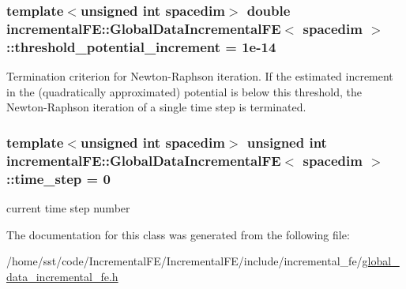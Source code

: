 \subsubsection[{\texorpdfstring{threshold\+\_\+potential\+\_\+increment}{threshold_potential_increment}}]{\setlength{\rightskip}{0pt plus 5cm}template$<$unsigned int spacedim$>$ double {\bf incremental\+F\+E\+::\+Global\+Data\+Incremental\+FE}$<$ spacedim $>$\+::threshold\+\_\+potential\+\_\+increment = 1e-\/14\hspace{0.3cm}{\ttfamily [private]}}\hypertarget{classincremental_f_e_1_1_global_data_incremental_f_e_a2f7adb8b4f7f8875715e1dbd0edd9ac8}{}\label{classincremental_f_e_1_1_global_data_incremental_f_e_a2f7adb8b4f7f8875715e1dbd0edd9ac8}
Termination criterion for Newton-\/\+Raphson iteration. If the estimated increment in the (quadratically approximated) potential is below this threshold, the Newton-\/\+Raphson iteration of a single time step is terminated. 
\subsubsection[{\texorpdfstring{time\+\_\+step}{time_step}}]{\setlength{\rightskip}{0pt plus 5cm}template$<$unsigned int spacedim$>$ unsigned int {\bf incremental\+F\+E\+::\+Global\+Data\+Incremental\+FE}$<$ spacedim $>$\+::time\+\_\+step = 0\hspace{0.3cm}{\ttfamily [private]}}\hypertarget{classincremental_f_e_1_1_global_data_incremental_f_e_a2aa7544464ad55c39f44c9e7e04b4bf6}{}\label{classincremental_f_e_1_1_global_data_incremental_f_e_a2aa7544464ad55c39f44c9e7e04b4bf6}
current time step number 

The documentation for this class was generated from the following file\+:\begin{DoxyCompactItemize}
\item 
/home/sst/code/\+Incremental\+F\+E/\+Incremental\+F\+E/include/incremental\+\_\+fe/\hyperlink{global__data__incremental__fe_8h}{global\+\_\+data\+\_\+incremental\+\_\+fe.\+h}\end{DoxyCompactItemize}
